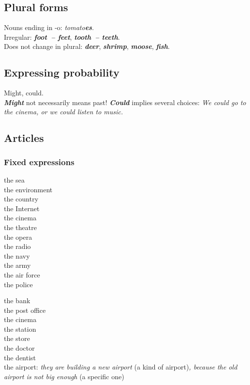 \documentclass[10pt,a4paper]{article}
\newcommand\ex[1]{\textit{\textbf{{#1}}}}           %
\begin{document}
\subsection{Plural forms}
Nouns ending in -o: \textit{tomato\ex{es}}.\\
Irregular: \ex{foot~-- feet}, \ex{tooth~-- teeth}.\\
Does not change in plural: \ex{deer}, \ex{shrimp}, \ex{moose}, \ex{fish}.




\subsection{Expressing probability}
Might, could.\\
\ex{Might} not necessarily means past! \ex{Could} implies several choices: \textit{We could go to the cinema, or we could listen to music.}






\subsection{Articles}

\subsubsection{Fixed expressions}

\begin{minipage}{0.32\linewidth}
the sea\\
the environment\\
the country\\
the Internet\\
the cinema\\
the theatre\\
the opera\\
the radio\\
the navy\\
the army\\
the air force\\
the police
\end{minipage}
\begin{minipage}{0.65\linewidth}
the bank\\
the post office\\
the cinema\\
the station\\
the store\\
the doctor\\
the dentist\\
the airport: \textit{they are building a new airport} (a kind of airport)\textit{, because the
old airport is not big enough} (a specific one)
\end{minipage}
\end{document}
